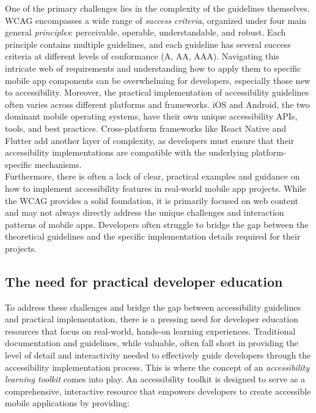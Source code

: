 One of the primary challenges lies in the complexity of the guidelines themselves. WCAG encompasses a wide range of \textit{success criteria}, organized under four main general \textit{principles}: perceivable, operable, understandable, and robust. Each principle contains multiple guidelines, and each guideline has several success criteria at different levels of conformance (A, AA, AAA). Navigating this intricate web of requirements and understanding how to apply them to specific mobile app components can be overwhelming for developers, especially those new to accessibility. 
Moreover, the practical implementation of accessibility guidelines often varies across different platforms and frameworks. iOS and Android, the two dominant mobile operating systems, have their own unique accessibility APIs, tools, and best practices. Cross-platform frameworks like React Native and Flutter add another layer of complexity, as developers must ensure that their accessibility implementations are compatible with the underlying platform-specific mechanisms. \\ 

Furthermore, there is often a lack of clear, practical examples and guidance on how to implement accessibility features in real-world mobile app projects. While the WCAG provides a solid foundation, it is primarily focused on web content and may not always directly address the unique challenges and interaction patterns of mobile apps. Developers often struggle to bridge the gap between the theoretical guidelines and the specific implementation details required for their projects.

\subsection{The need for practical developer education}

To address these challenges and bridge the gap between accessibility guidelines and practical implementation, there is a pressing need for developer education resources that focus on real-world, hands-on learning experiences. Traditional documentation and guidelines, while valuable, often fall short in providing the level of detail and interactivity needed to effectively guide developers through the accessibility implementation process.
This is where the concept of an \textit{accessibility learning toolkit} comes into play. An accessibility toolkit is designed to serve as a comprehensive, interactive resource that empowers developers to create accessible mobile applications by providing:

